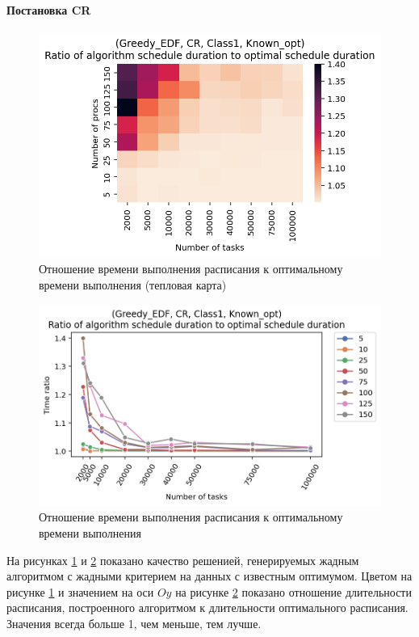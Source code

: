 \paragraph{Постановка CR}

\begin{figure}[!htbp]
    \centering
    \includegraphics[width=\textwidth]{imgs/ideal_1/CR_EDF/th.png}
    \caption{Отношение времени выполнения расписания к оптимальному времени выполнения (тепловая карта)}
    \label{fig:CR-EDF-times-heatmap}
\end{figure}

\begin{figure}[!htbp]
    \centering
    \includegraphics[width=\textwidth]{imgs/ideal_1/CR_EDF/gr_amalgamated.png}
    \caption{Отношение времени выполнения расписания к оптимальному времени выполнения} 
    \label{fig:CR-EDF-times-compiled}
\end{figure}

На рисунках \ref{fig:CR-EDF-times-heatmap} и \ref{fig:CR-EDF-times-compiled} показано качество решенией, генерируемых жадным алгоритмом с жадными критерием на данных с известным оптимумом. Цветом на рисунке \ref{fig:CR-EDF-times-heatmap} и значением на оси $Oy$ на рисунке \ref{fig:CR-EDF-times-compiled} показано отношение длительности расписания, построенного алгоритмом к длительности оптимального расписания. Значения всегда больше 1, чем меньше, тем лучше.

